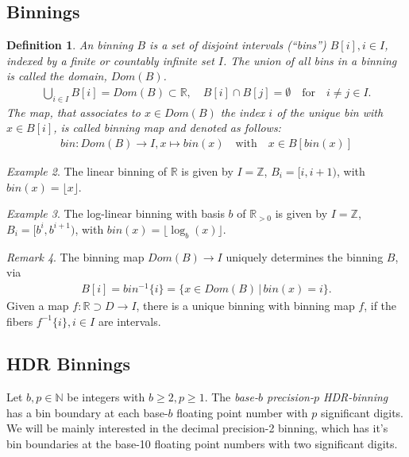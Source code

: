 \documentclass{article}
\theoremstyle{plain}
\newtheorem{definition}{Definition}[section]
\theoremstyle{remark}
\newtheorem{remark}[definition]{Remark}
\newtheorem{example}[definition]{Example}
\newcommand{\IN}{\mathbb{N}}
\newcommand{\IR}{\mathbb{R}}
\newcommand{\IZ}{\mathbb{Z}}
\newcommand{\Union}{\bigcup}
\newcommand{\defn}{\emph} %
\newcommand{\qtext}[1]{\quad\text{#1}\quad} %
\newcommand{\lra}{\longrightarrow}
\newcommand{\floor}[1]{\lfloor#1\rfloor}
\begin{document}
\subsection{Binnings}

\begin{definition}
  An binning $B$ is a set of disjoint intervals (``bins'') $B[i], i\in I$, indexed by a
  finite or countably infinite set $I$.
  The union of all bins in a binning is called the domain, $Dom(B)$.
  \begin{align*}
    \Union_{i \in I} B[i] = Dom(B) \subset \IR,\quad B[i] \cap B[j] = \emptyset \qtext{for} i \neq j \in I.
  \end{align*}
  The map, that associates to $x \in Dom(B)$ the index $i$ of the unique bin with $x \in B[i]$,
  is called \defn{binning map}
  and denoted as follows:
  \begin{align*}
    bin: Dom(B) \lra I, x \mapsto bin(x) \qtext{with} x \in B[bin(x)]
  \end{align*}
\end{definition}

\begin{example}
  The linear binning of $\IR$ is given by $I = \IZ$, $B_i = [i, i+1)$, with $bin(x)=\floor{x}$.
\end{example}

\begin{example}
  The log-linear binning with basis $b$ of $\IR_{>0}$ is given by $I=\IZ$, $B_i = [b^i, b^{i+1})$, with $bin(x)=\floor{\log_b(x)}$.
\end{example}

\begin{remark}
  The binning map $Dom(B) \lra I$ uniquely determines the binning $B$, via
  \begin{align*}
    B[i] = bin^{-1}\{ i \} = \{ x \in Dom(B) \,|\, bin(x) = i \}.
  \end{align*}
  Given a map $f:\IR \supset D \lra I$, there is a unique binning with binning map $f$, if the fibers $f^{-1}\{i\}, i \in I$ are intervals.
\end{remark}

\subsection{HDR Binnings}
\newcommand{\float}{\mathrm{float}}
\newcommand{\bin}{\mathrm{bin}}

Let $b,p \in \IN$ be integers with $b\geq 2, p \geq 1$.
The \defn{base-$b$ precision-$p$ HDR-binning} has a bin boundary at each base-$b$ floating point number with $p$ significant digits.
We will be mainly interested in the decimal precision-2 binning, which has it's bin boundaries at the base-10 floating point numbers with two significant digits.
\end{document}
